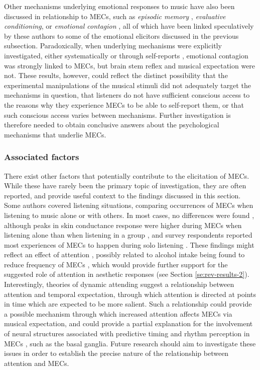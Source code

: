 Other mechanisms underlying emotional responses to music have also been discussed in relationship to MECs, such as \emph{episodic memory} \parencite{goldstein1980}, \emph{evaluative conditioning}, or \emph{emotional contagion} \parencite{harrison2014}, all of which have been linked speculatively by these authors to some of the emotional elicitors discussed in the previous subsection. Paradoxically, when underlying mechanisms were explicitly investigated, either systematically \parencite{juslin2014} or through self-reports \parencite{bannister2018, bannister2020a}, emotional contagion was strongly linked to MECs, but brain stem reflex and musical expectation were not. These results, however, could reflect the distinct possibility that the experimental manipulations of the musical stimuli did not adequately target the mechanisms in question, that listeners do not have sufficient conscious access to the reasons why they experience MECs to be able to self-report them, or that such conscious access varies between mechanisms. Further investigation is therefore needed to obtain conclusive answers about the psychological mechanisms that underlie MECs.

\subsubsection{Associated factors}

There exist other factors that potentially contribute to the elicitation of MECs. While these have rarely been the primary topic of investigation, they are often reported, and provide useful context to the findings discussed in this section. Some authors covered listening situations, comparing occurrences of MECs when listening to music alone or with others. In most cases, no differences were found \parencite{egermann2011, nusbaum2014, sutherland2009}, although peaks in skin conductance response were higher during MECs when listening alone than when listening in a group \parencite{egermann2011}, and survey respondents reported most experiences of MECs to happen during solo listening \parencite{bannister2020a}. These findings might reflect an effect of attention \parencites{beier2020, nusbaum2014}[see also][]{mori2014a}, possibly related to alcohol intake being found to reduce frequency of MECs \parencite{starcke2019}, which would provide further support for the suggested role of attention in aesthetic responses (see Section \ref{se:rev-results-2}). Interestingly, theories of dynamic attending \parencite{jones1989, large1999} suggest a relationship between attention and temporal expectation, through which attention is directed at points in time which are expected to be more salient. Such a relationship could provide a possible mechanism through which increased attention affects MECs via musical expectation, and could provide a partial explanation for the involvement of neural structures associated with predictive timing and rhythm perception in MECs \parencite{grahn2007, teki2011}, such as the basal ganglia. Future research should aim to investigate these issues in order to establish the precise nature of the relationship between attention and MECs.

